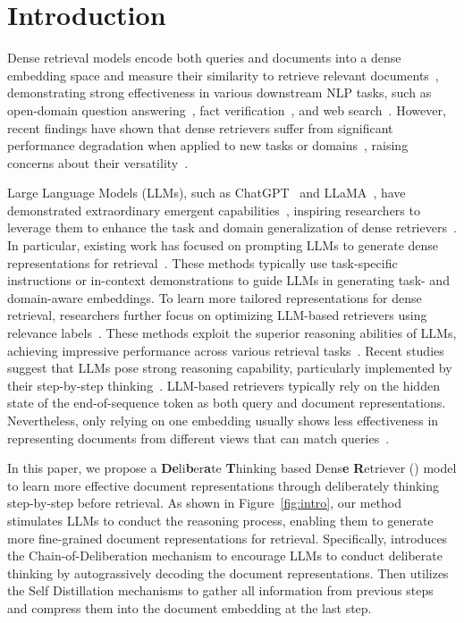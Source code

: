 \section{Introduction}
Dense retrieval models encode both queries and documents into a dense embedding space and measure their similarity to retrieve relevant documents~\cite{karpukhin2020dense, zhao2024dense, xiong2020approximate}, demonstrating strong effectiveness in various downstream NLP tasks, such as open-domain question answering~\cite{chen2020open}, fact verification~\cite{liu2019fine}, and web search~\cite{chen2024ms}. However, recent findings have shown that dense retrievers suffer from significant performance degradation when applied to new tasks or domains~\cite{su2022one}, raising concerns about their versatility~\cite{luo2024large, khramtsova2024leveraging}.


Large Language Models (LLMs), such as ChatGPT~\cite{achiam2023gpt} and LLaMA~\cite{touvron2023llama}, have demonstrated extraordinary emergent capabilities~\cite{wei2022emergent, zhao2023survey}, inspiring researchers to leverage them to enhance the task and domain generalization of dense retrievers~\cite{zhu2023large, khramtsova2024leveraging}. In particular, existing work has focused on prompting LLMs to generate dense representations for retrieval~\cite{zhuang2024promptreps}. These methods typically use task-specific instructions or in-context demonstrations to guide LLMs in generating task- and domain-aware embeddings. To learn more tailored representations for dense retrieval, researchers further focus on optimizing LLM-based retrievers using relevance labels~\cite{ma2024fine, neelakantan2022text, li2025making}. These methods exploit the superior reasoning abilities of LLMs, achieving impressive performance across various retrieval tasks~\cite{wang2023improving, zhu2023large, luo2024large}. Recent studies suggest that LLMs pose strong reasoning capability, particularly implemented by their step-by-step thinking~\cite{kudo2024think,wei2022chain}. LLM-based retrievers typically rely on the hidden state of the end-of-sequence token as both query and document representations. Nevertheless, only relying on one embedding usually shows less effectiveness in representing documents from different views that can match queries~\cite{zhang2022multi,khattab2020colbert}. 

In this paper, we propose a \textbf{D}\textbf{e}li\textbf{b}er\textbf{a}te \textbf{T}hinking based Dens\textbf{e} \textbf{R}etriever (\method{}) model to learn more effective document representations through deliberately thinking step-by-step before retrieval. As shown in Figure~\ref{fig:intro}, our method stimulates LLMs to conduct the reasoning process, enabling them to generate more fine-grained document representations for retrieval. Specifically, \method{} introduces the Chain-of-Deliberation mechanism to encourage LLMs to conduct deliberate thinking by autograssively decoding the document representations. Then \method{} utilizes the Self Distillation mechanisms to gather all information from previous steps and compress them into the document embedding at the last step.

